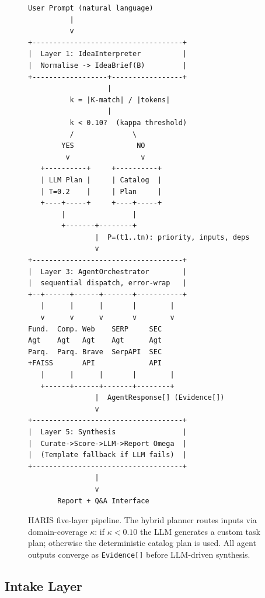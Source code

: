 \documentclass[preprint,12pt]{elsarticle}
\begin{document}
\begin{figure}[!t]
\centering
\footnotesize
\begin{minipage}{\linewidth}
\begin{verbatim}
User Prompt (natural language)
          |
          v
+------------------------------------+
|  Layer 1: IdeaInterpreter          |
|  Normalise -> IdeaBrief(B)         |
+------------------+-----------------+
                   |
          k = |K-match| / |tokens|
                   |
          k < 0.10?  (kappa threshold)
          /              \
        YES               NO
         v                 v
   +----------+     +----------+
   | LLM Plan |     | Catalog  |
   | T=0.2    |     | Plan     |
   +----+-----+     +----+-----+
        |                |
        +-------+--------+
                |  P=(t1..tn): priority, inputs, deps
                v
+------------------------------------+
|  Layer 3: AgentOrchestrator        |
|  sequential dispatch, error-wrap   |
+--+------+------+-------+-----------+
   |      |      |       |        |
   v      v      v       v        v
Fund.  Comp. Web    SERP     SEC
Agt    Agt   Agt    Agt      Agt
Parq.  Parq. Brave  SerpAPI  SEC
+FAISS       API             API
   |      |      |       |        |
   +------+------+-------+--------+
                |  AgentResponse[] (Evidence[])
                v
+------------------------------------+
|  Layer 5: Synthesis                |
|  Curate->Score->LLM->Report Omega  |
|  (Template fallback if LLM fails)  |
+------------------------------------+
                |
                v
       Report + Q&A Interface
\end{verbatim}
\end{minipage}
\caption{HARIS five-layer pipeline. The hybrid planner routes inputs via
  domain-coverage $\kappa$: if $\kappa < 0.10$ the LLM generates a custom
  task plan; otherwise the deterministic catalog plan is used. All agent
  outputs converge as \texttt{Evidence[]} before LLM-driven synthesis.}
\label{fig:arch}
\end{figure}

\subsection{Intake Layer}
\end{document}
